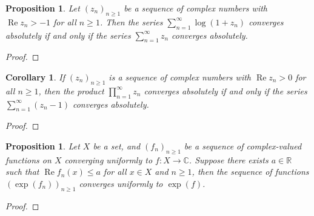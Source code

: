 \documentclass[11pt]{article}
\theoremstyle{thmstyle}
\newtheorem{proposition}[theorem]{Proposition}
\theoremstyle{defstyle}
\newtheorem{corollary}[theorem]{Corollary}
\newcommand{\R}{\mathbb{R}}
\newcommand{\bbC}{\mathbb{C}}
\renewcommand{\le}{\leqslant}
\renewcommand{\ge}{\geqslant}
\renewcommand{\Re}{\operatorname{Re}}
\begin{document}
\begin{proposition}
    Let $(z_n)_{n\ge 1}$ be a sequence of complex numbers with $\Re z_n > - 1$ for all $n\ge 1$. Then the series $\displaystyle\sum_{n = 1}^\infty\log(1 + z_n)$ converges absolutely if and only if the series $\displaystyle\sum_{n = 1}^\infty z_n$ converges absolutely.
\end{proposition}
\begin{proof}
\end{proof}

\begin{corollary}
    If $(z_n)_{n\ge 1}$ is a sequence of complex numbers with $\Re z_n > 0$ for all $n\ge 1$, then the product $\displaystyle\prod_{n = 1}^\infty z_n$ converges absolutely if and only if the series $\displaystyle\sum_{n = 1}^\infty (z_n - 1)$ converges absolutely.
\end{corollary}
\begin{proof}
\end{proof}

\begin{proposition}
    Let $X$ be a set, and $(f_n)_{n\ge 1}$ be a sequence of complex-valued functions on $X$ converging uniformly to $f\colon X\to\bbC$. Suppose there exists $a\in\R$ such that $\Re f_n(x)\le a$ for all $x\in X$ and $n\ge 1$, then the sequence of functions $\left(\exp(f_n)\right)_{n\ge 1}$ converges uniformly to $\exp(f)$.
\end{proposition}
\begin{proof}
\end{proof}
\end{document}
